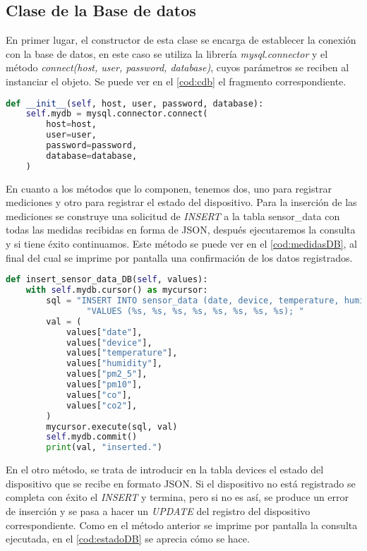 \subsection{Clase de la Base de datos}
En primer lugar, el constructor de esta clase se encarga de establecer la conexión con la base de datos, en este caso se utiliza la librería \textit{mysql.connector} y el método \textit{connect(host, user, password, database)}, cuyos parámetros se reciben al instanciar el objeto. Se puede ver en el \autoref{cod:cdb} el fragmento correspondiente.
\begin{lstlisting}[language=Python, label=cod:cdb, caption=Conexión con la base de datos]
def __init__(self, host, user, password, database):
    self.mydb = mysql.connector.connect(
        host=host,
        user=user,
        password=password,
        database=database,
    )
\end{lstlisting}
En cuanto a los métodos que lo componen, tenemos dos, uno para registrar mediciones y otro para registrar el estado del dispositivo. Para la inserción de las mediciones se construye una solicitud de \textit{INSERT} a la tabla sensor\_data con todas las medidas recibidas en forma de JSON, después ejecutaremos la consulta y si tiene éxito continuamos. Este método se puede ver en el \autoref{cod:medidasDB}, al final del cual se imprime por pantalla una confirmación de los datos registrados.
\begin{lstlisting}[language=Python, label=cod:medidasDB, caption=Inserción de mediciones en la base de datos]
def insert_sensor_data_DB(self, values):
    with self.mydb.cursor() as mycursor:
        sql = "INSERT INTO sensor_data (date, device, temperature, humidity, pm2_5, pm10, co, co2)" \
                "VALUES (%s, %s, %s, %s, %s, %s, %s, %s); "
        val = (
            values["date"],
            values["device"],
            values["temperature"],
            values["humidity"],
            values["pm2_5"],
            values["pm10"],
            values["co"],
            values["co2"],
        )
        mycursor.execute(sql, val)
        self.mydb.commit()
        print(val, "inserted.")
\end{lstlisting}
En el otro método, se trata de introducir en la tabla devices el estado del dispositivo que se recibe en formato JSON. Si el dispositivo no está registrado se completa con éxito el \textit{INSERT} y termina, pero si no es así, se produce un error de inserción y se pasa a hacer un \textit{UPDATE} del registro del dispositivo correspondiente. Como en el método anterior se imprime por pantalla la consulta ejecutada, en el \autoref{cod:estadoDB} se aprecia cómo se hace.
